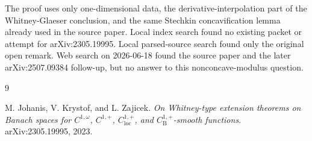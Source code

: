 \documentclass[11pt]{article}
\begin{document}
The proof uses only one-dimensional data, the derivative-interpolation part of
the Whitney-Glaeser conclusion, and the same Stechkin concavification lemma
already used in the source paper.  Local index search found no existing packet
or attempt for arXiv:2305.19995.  Local parsed-source search found only the
original open remark.  Web search on 2026-06-18 found the source paper and the
later arXiv:2507.09384 follow-up, but no answer to this nonconcave-modulus
question.

\begin{thebibliography}{9}

M. Johanis, V. Krystof, and L. Zajicek.
\newblock \emph{On Whitney-type extension theorems on Banach spaces for
\(C^{1,\omega}\), \(C^{1,+}\), \(C_{\mathrm{loc}}^{1,+}\), and
\(C_{\mathrm B}^{1,+}\)-smooth functions}.
\newblock arXiv:2305.19995, 2023.

\end{thebibliography}
\end{document}
